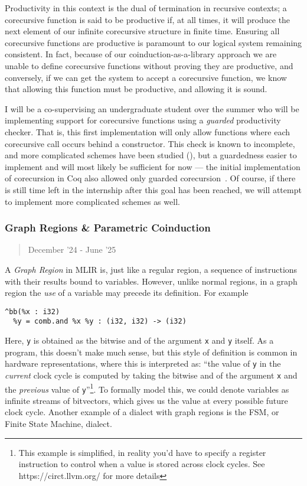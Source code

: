 \documentclass[a4paper]{scrartcl}
\begin{document}
Productivity in this context is the dual of termination in recursive
contexts; a corecursive function is said to be productive if, at all
times, it will produce the next element of our infinite corecursive
structure in finite time. Ensuring all corecursive functions are
productive is paramount to our logical system remaining consistent. In
fact, because of our coinduction-as-a-library approach we are unable to
define corecursive functions without proving they are productive, and
conversely, if we can get the system to accept a corecursive function,
we know that allowing this function must be productive, and allowing it
is sound.

I will be a co-supervising an undergraduate student over the summer who
will be implementing support for corecursive functions using a
\emph{guarded} productivity checker. That is, this first implementation
will only allow functions where each corecursive call occurs behind
a constructor. This check is known to incomplete, and more complicated
schemes have been studied
(\cite{blanchetteFriendsBenefitsImplementing2017}), but a
guardedness easier to implement and will most likely be sufficient for
now --- the initial implementation of corecursion in Coq also allowed
only guarded corecursion~\cite{gimenezTutorialRecursiveTypes1998}.
Of course, if there is still time left in the internship after this goal
has been reached, we will attempt to implement more complicated schemes
as well.


\subsubsection{Graph Regions \& Parametric
Coinduction}\label{graph-regions-parametric-coinduction}

\begin{quote}
December '24 - June '25
\end{quote}

A \emph{Graph Region} in MLIR is, just like a regular region, a sequence
of instructions with their results bound to variables. However, unlike
normal regions, in a graph region the \emph{use} of a variable may
precede its definition. For example

\begin{verbatim}
^bb(%x : i32)
  %y = comb.and %x %y : (i32, i32) -> (i32)
\end{verbatim}

Here, \texttt{y} is obtained as the bitwise and of the argument
\texttt{x} and \texttt{y} itself. As a program, this doesn't make much
sense, but this style of definition is common in hardware
representations, where this is interpreted as: ``the value of \texttt{y}
in the \emph{current} clock cycle is computed by taking the bitwise and
of the argument \texttt{x} and the \emph{previous} value of \texttt{y}''\footnote{This example is simplified, in reality you'd have to specify a register instruction to control when a value is stored across clock cycles. See https://circt.llvm.org/ for more details}.
To formally model this, we could denote variables as infinite streams of bitvectors,
which gives us the value at every possible future clock cycle. Another
example of a dialect with graph regions is the FSM, or Finite State
Machine, dialect.
\end{document}
